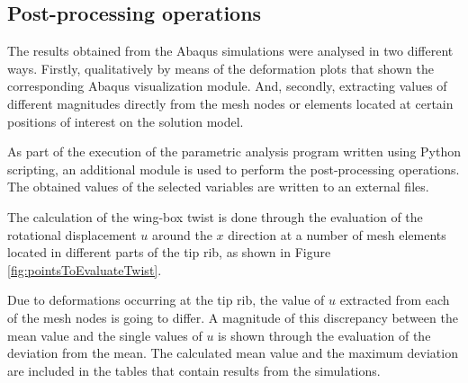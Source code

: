   \clearpage
  \subsection{Post-processing operations} \label{subsec:postProc_computationalModel} %

    The results obtained from the Abaqus simulations were analysed in two different ways. Firstly, qualitatively by means of the deformation plots that shown the corresponding Abaqus visualization module. And, secondly, extracting values of different magnitudes directly from the mesh nodes or elements located at certain positions of interest on the solution model.


    As part of the execution of the parametric analysis program written using Python scripting, an additional module is used to perform the post-processing operations. The obtained values of the selected variables are written to an external files. 

    The calculation of the wing-box twist is done through the evaluation of the rotational displacement $u$ around the $x$ direction at a number of mesh elements located in different parts of the tip rib, as shown in Figure \ref{fig:pointsToEvaluateTwist}.

    Due to deformations occurring at the tip rib, the value of $u$ extracted from each of the mesh nodes is going to differ. A magnitude of this discrepancy between the mean value and the single values of $u$ is shown through the evaluation of the deviation from the mean. The calculated mean value and the maximum deviation are included in the tables that contain results from the simulations.

